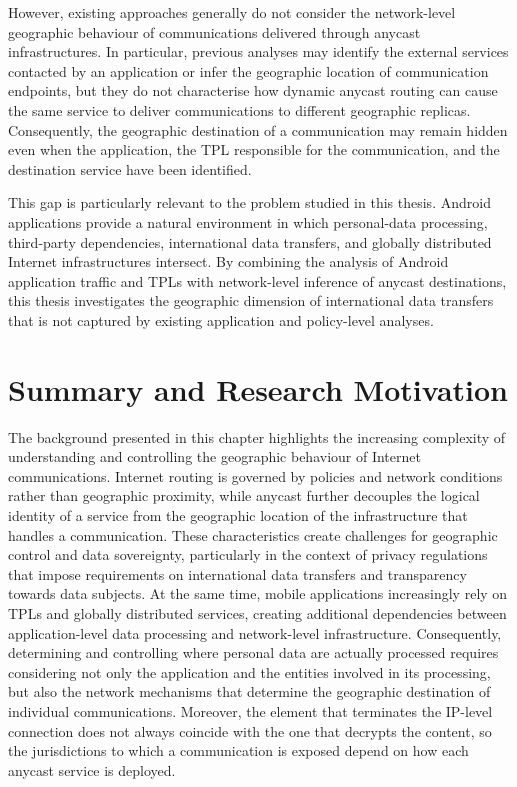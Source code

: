 However, existing approaches generally do not consider the network-level geographic behaviour of communications delivered through anycast infrastructures. In particular, previous analyses may identify the external services contacted by an application or infer the geographic location of communication endpoints, but they do not characterise how dynamic anycast routing can cause the same service to deliver communications to different geographic replicas. Consequently, the geographic destination of a communication may remain hidden even when the application, the TPL responsible for the communication, and the destination service have been identified.

This gap is particularly relevant to the problem studied in this thesis. Android applications provide a natural environment in which personal-data processing, third-party dependencies, international data transfers, and globally distributed Internet infrastructures intersect. By combining the analysis of Android application traffic and TPLs with network-level inference of anycast destinations, this thesis investigates the geographic dimension of international data transfers that is not captured by existing application and policy-level analyses.

\section{Summary and Research Motivation}
\label{sec:background_summary}

The background presented in this chapter highlights the increasing complexity of understanding and controlling the geographic behaviour of Internet communications. Internet routing is governed by policies and network conditions rather than geographic proximity, while anycast further decouples the logical identity of a service from the geographic location of the infrastructure that handles a communication. These characteristics create challenges for geographic control and data sovereignty, particularly in the context of privacy regulations that impose requirements on international data transfers and transparency towards data subjects. At the same time, mobile applications increasingly rely on TPLs and globally distributed services, creating additional dependencies between application-level data processing and network-level infrastructure. Consequently, determining and controlling where personal data are actually processed requires considering not only the application and the entities involved in its processing, but also the network mechanisms that determine the geographic destination of individual communications. Moreover, the element that terminates the IP-level connection does not always coincide with the one that decrypts the content, so the jurisdictions to which a communication is exposed depend on how each anycast service is deployed.

